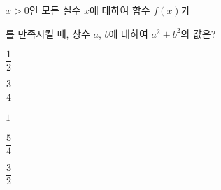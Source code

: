 \hspace*{2mm}\begin{minipage}[t]{\dimexpr\linewidth-2mm\relax}\vspace{0pt}
$x>0$인 모든 실수 $x$에 대하여 함수 $f(x)$가 \par\smallskip{}\par\smallskip\noindent 를 만족시킬 때, 상수 $a$, $b$에 대하여 $a^2+b^2$의 값은?
\begin{choices32}{\rule[-3ex]{0pt}{8ex}$\dfrac{1}{2}$}{\rule[-3ex]{0pt}{8ex}$\dfrac{3}{4}$}{\rule[-3ex]{0pt}{8ex}$1$}{\rule[-3ex]{0pt}{8ex}$\dfrac{5}{4}$}{\rule[-3ex]{0pt}{8ex}$\dfrac{3}{2}$}\end{choices32}\end{minipage}
